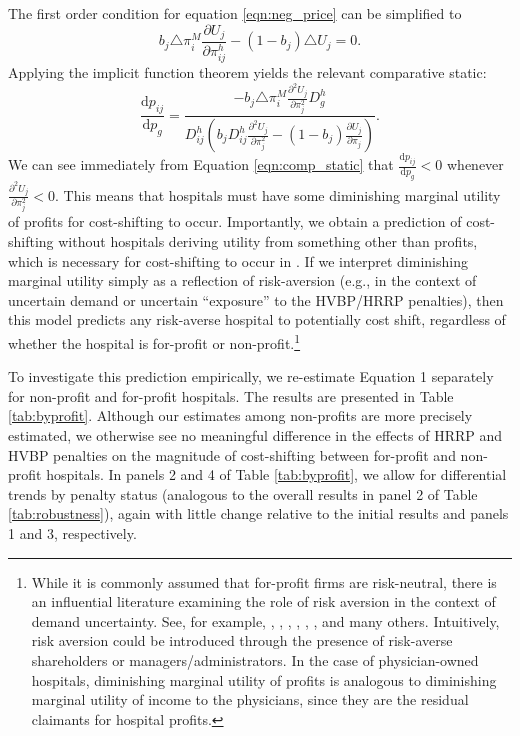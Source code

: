 \documentclass[12pt]{article}
\newcommand{\deriv}[2]{\frac{\mathrm{d}#1}{\mathrm{d}#2}}
\newcommand{\pderiv}[2]{\frac{\partial#1}{\partial#2}}
\begin{document}
The first order condition for equation \ref{eqn:neg_price} can be simplified to
\begin{equation}
 b_{j} \triangle \pi_{i}^{M} \pderiv{U_{j}}{\pi_{ij}^{h}} - (1-b_{j}) \triangle U_{j} = 0.
\label{eqn:price_foc}
\end{equation}
Applying the implicit function theorem yields the relevant comparative static:
\begin{equation}
\deriv{p_{ij}}{p_{g}} = \frac{- b_{j} \triangle \pi_{i}^{M} \pderiv{^{2}U_{j}}{\pi_{j}^{2}}D_{g}^{h}}{D_{ij}^{h}\left(b_{j} D_{ij}^{h} \pderiv{^{2}U_{j}}{\pi_{j}^{2}} - (1-b_{j}) \pderiv{U_{j}}{\pi_{j}} \right)}.
\label{eqn:comp_static}
\end{equation}
We can see immediately from Equation \ref{eqn:comp_static} that $\deriv{p_{ij}}{p_{g}}<0$ whenever $\pderiv{^{2}U_{j}}{\pi_{j}^{2}}<0$. This means that hospitals must have some diminishing marginal utility of profits for cost-shifting to occur. Importantly, we obtain a prediction of cost-shifting without hospitals deriving utility from something other than profits, which is necessary for cost-shifting to occur in \cite{dranove1988}. If we interpret diminishing marginal utility simply as a reflection of risk-aversion (e.g., in the context of uncertain demand or uncertain ``exposure'' to the HVBP/HRRP penalties), then this model predicts any risk-averse hospital to potentially cost shift, regardless of whether the hospital is for-profit or non-profit.\footnote{While it is commonly assumed that for-profit firms are risk-neutral, there is an influential literature examining the role of risk aversion in the context of demand uncertainty. See, for example, \cite{sandmo1971}, \cite{holthausen1979}, \cite{mcdonald1985}, \cite{guiso1999}, \cite{chavas1996}, \cite{asplund2002}, and many others. Intuitively, risk aversion could be introduced through the presence of risk-averse shareholders or managers/administrators. In the case of physician-owned hospitals, diminishing marginal utility of profits is analogous to diminishing marginal utility of income to the physicians, since they are the residual claimants for hospital profits.}

To investigate this prediction empirically, we re-estimate Equation 1 separately for non-profit and for-profit hospitals.  The results are presented in Table \ref{tab:byprofit}. Although our estimates among non-profits are more precisely estimated, we otherwise see no meaningful difference in the effects of HRRP and HVBP penalties on the magnitude of cost-shifting between for-profit and non-profit hospitals. In panels 2 and 4 of Table \ref{tab:byprofit}, we allow for differential trends by penalty status (analogous to the overall results in panel 2 of Table \ref{tab:robustness}), again with little change relative to the initial results and panels 1 and 3, respectively.
\end{document}
